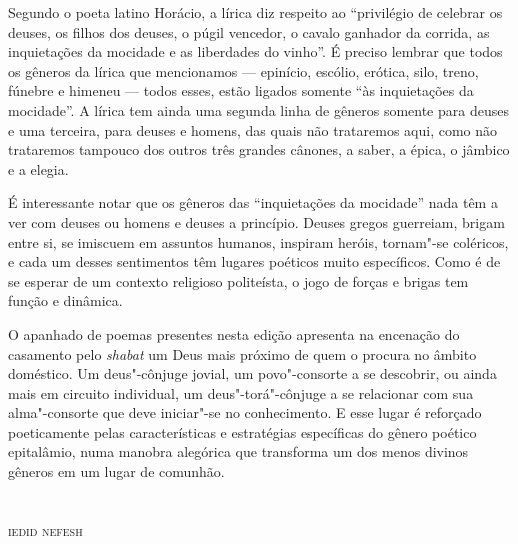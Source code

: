 {{Segundo o poeta latino Horácio, a lírica diz respeito ao ``privilégio de
celebrar os deuses, os filhos dos deuses, o púgil vencedor, o cavalo
ganhador da corrida, as inquietações da mocidade e as liberdades
do vinho''. É preciso lembrar que todos os gêneros da lírica que
mencionamos --- epinício, escólio, erótica, silo, treno, fúnebre e
himeneu --- todos esses, estão ligados somente ``às inquietações da
mocidade''. A lírica tem ainda uma segunda linha de gêneros somente para
deuses e uma terceira, para deuses e homens, das quais não trataremos
aqui, como não trataremos tampouco dos outros três grandes cânones, a
saber, a épica, o jâmbico e a elegia.

É interessante notar que os gêneros das ``inquietações da mocidade'' nada
têm a ver com deuses ou homens e deuses a princípio. Deuses gregos
guerreiam, brigam entre si, se imiscuem em assuntos humanos, inspiram
heróis, tornam"-se coléricos, e cada um desses sentimentos têm lugares
poéticos muito específicos. Como é de se esperar de um contexto
religioso politeísta, o jogo de forças e brigas tem função e dinâmica.

O apanhado de poemas presentes nesta edição apresenta na encenação do
casamento pelo \emph{shabat} um Deus mais próximo de quem o procura no âmbito
doméstico. Um deus"-cônjuge jovial, um povo"-consorte a se descobrir, ou
ainda mais em circuito individual, um deus"-torá"-cônjuge a se relacionar
com sua alma"-consorte que deve iniciar"-se no conhecimento. E esse lugar
é reforçado poeticamente pelas características e estratégias específicas
do gênero poético epitalâmio, numa manobra alegórica que transforma um
dos menos divinos gêneros em um lugar de comunhão.
}}


\chapter*{}
\begin{center}
\begin{vplace}[0.3]
\Large
{}
\end{vplace}
\end{center}
\thispagestyle{empty}

\begingroup
\movetoevenpage
\raggedleft

\vspace*{1cm}

\textsc{iedid nefesh}\\[15pt]

